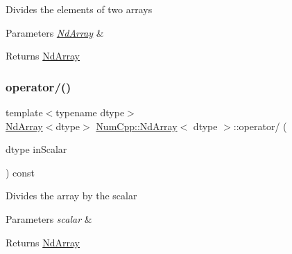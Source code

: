 Divides the elements of two arrays


\begin{DoxyParams}{Parameters}
{\em \mbox{\hyperlink{class_num_cpp_1_1_nd_array}{Nd\+Array}}} & \\
\hline
\end{DoxyParams}
\begin{DoxyReturn}{Returns}
\mbox{\hyperlink{class_num_cpp_1_1_nd_array}{Nd\+Array}} 
\end{DoxyReturn}
\mbox{\label{class_num_cpp_1_1_nd_array_a1e311017d6068b62551da78bdc78ac34}} 
\subsubsection{\texorpdfstring{operator/()}{operator/()}\hspace{0.1cm}{\footnotesize\ttfamily [2/2]}}
{\footnotesize\ttfamily template$<$typename dtype$>$ \\
\mbox{\hyperlink{class_num_cpp_1_1_nd_array}{Nd\+Array}}$<$dtype$>$ \mbox{\hyperlink{class_num_cpp_1_1_nd_array}{Num\+Cpp\+::\+Nd\+Array}}$<$ dtype $>$\+::operator/ (\begin{DoxyParamCaption}\item[{dtype}]{in\+Scalar }\end{DoxyParamCaption}) const\hspace{0.3cm}{\ttfamily [inline]}}

Divides the array by the scalar


\begin{DoxyParams}{Parameters}
{\em scalar} & \\
\hline
\end{DoxyParams}
\begin{DoxyReturn}{Returns}
\mbox{\hyperlink{class_num_cpp_1_1_nd_array}{Nd\+Array}} 
\end{DoxyReturn}
\mbox{\label{class_num_cpp_1_1_nd_array_adf0d1f8d1b8f1c1a77551e2d5d864061}} 
